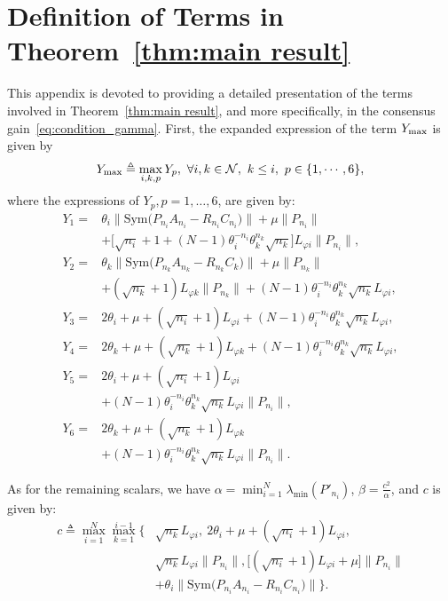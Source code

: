 \documentclass{ifacconf}
\begin{document}
\section{Definition of Terms in Theorem~\ref{thm:main result}}\label{appen:def}
\vspace*{-0.3cm}
This appendix is devoted to providing a detailed presentation of the terms involved in Theorem~\ref{thm:main result}, and more specifically, in the consensus gain~\eqref{eq:condition_gamma}. First, the expanded expression of the term $Y_{\rm max}$ is given by
\begin{equation}
    \begin{aligned}
        Y_{\rm max} \triangleq \max_{i,k,p} Y_p,\ \forall i,k\in\mathcal{N},\ k\le i,\ p\in\{1,\cdots,6\},
    \end{aligned}\label{eq:maxvalue of distributed gain condition}
\end{equation}
where the expressions of $Y_p, p=1,\dots,6$, are given by:
{\small
\begin{align*}
    Y_1 =&\theta_i\Big\|\mathrm{Sym}\big(P_{n_i}A_{n_i}-R_{n_i}C_{n_i}\big)\Big\|+\mu\|P_{n_i}\|\\
        &+\Big[\sqrt{n_i}+1+( N-1)\theta_i^{-n_i}\theta_k^{n_k}\sqrt{n_k}\Big]L_{\varphi i}\|P_{n_i}\|, \\
    Y_2=&\theta_k\Big\|\mathrm{Sym}\big(P_{n_k}A_{n_k}-R_{n_k}C_{k}\big)\Big\|+\mu\|P_{n_k}\|\\
            &+(\sqrt{n_k}+1)L_{\varphi k}\|P_{n_k}\|+(N-1)\theta_i^{-n_i}\theta_k^{n_k}\sqrt{n_k}L_{\varphi i}, \\
    Y_3 =&2\theta_i+\mu+(\sqrt{n_i}+1)L_{\varphi i}+(N-1)\theta_i^{-n_i}\theta_k^{n_k}\sqrt{n_k}L_{\varphi i}, \\
    Y_4=&2\theta_k+\mu+(\sqrt{n_k}+1)L_{\varphi k}+(N-1)\theta_i^{-n_i}\theta_k^{n_k}\sqrt{n_k}L_{\varphi i}, \\
    Y_5=&2\theta_i+\mu+(\sqrt{n_i}+1)L_{\varphi i}\\
    &+(N-1)\theta_i^{-n_i}\theta_k^{n_k}\sqrt{n_k}L_{\varphi i}\|P_{n_i}\|,\\
    Y_6=&2\theta_k+\mu+(\sqrt{n_k}+1)L_{\varphi k}\\
    &+(N-1)\theta_i^{-n_i}\theta_k^{n_k}\sqrt{n_k}L_{\varphi i}\|P_{n_i}\|.
\end{align*}
}

As for the remaining scalars, we have $\displaystyle\alpha = \min_{i=1}^{N}\lambda_{\min}(P'_{n_i})$, $\displaystyle \beta = \frac{c^2}{\alpha}$, and $c$ is given by:
\begin{align}
\label{eq:max norm of Vcoupling}
    c \triangleq\max_{i=1}^{N}\max_{k=1}^{i-1}\bigg\{& \sqrt{n_k}L_{\varphi i},\ 2\theta_i+\mu+(\sqrt{n_i}+1)L_{\varphi i},\nonumber\\
    &\sqrt{n_k}L_{\varphi i}\|P_{n_i}\|, \big[(\sqrt{n_i}+1)L_{\varphi i}+\mu\big]\|P_{n_i}\| \nonumber\\
    &+\theta_i\Big\|\mathrm{Sym}\big(P_{n_i}A_{n_i}-R_{n_i}C_{n_i}\big)\Big\|\bigg\}.
\end{align}

\vspace*{-0.3cm}
    
\end{document}
